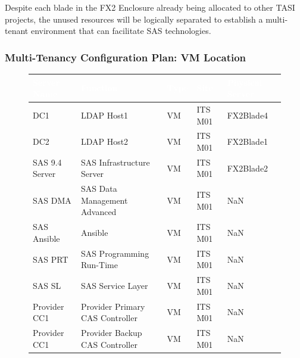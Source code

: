 Despite each blade in the FX2 Enclosure already being allocated to other TASI projects, the unused resources will be logically separated to establish a multi-tenant environment that can facilitate SAS technologies.

\newpage 

\subsubsection{Multi-Tenancy Configuration Plan: VM Location}
\label{Multi-Tenancy Configuration Plan}

\begin{figure}[H]
\begin{center}
    \renewcommand{\arraystretch}{1.5}
    \begin{tabular}{|>{\raggedright\arraybackslash}l 
                    |>{\raggedright\arraybackslash}m{6cm} 
                    |>{\raggedright\arraybackslash}l 
                    |>{\raggedright\arraybackslash}l 
                    |>{\raggedright\arraybackslash}l 
                    |}
    \hline
    \rowcolor[HTML]{196fb4}\centering\textcolor{white}{\large Server Name} 
                            & \centering\textcolor{white}{\large Function} 
                            & \centering\textcolor{white}{\large Type} 
                            & \centering\textcolor{white}{\large Site} 
                            & \centering\textcolor{white}{\large Physical Server} 
                            \tabularnewline 
    \hline
    DC1	           & LDAP Host1                         & VM & ITS M01 & FX2Blade4 \\\hline
    DC2	           & LDAP Host2                         & VM & ITS M01 & FX2Blade1 \\\hline
    SAS 9.4 Server & SAS Infrastructure Server          & VM & ITS M01 & FX2Blade2 \\\hline
    SAS DMA	       & SAS Data Management Advanced       & VM & ITS M01 & NaN	\\\hline
    SAS Ansible	   & Ansible	                        & VM & ITS M01 & NaN	\\\hline
    SAS PRT	       & SAS Programming Run-Time	        & VM & ITS M01 & NaN	\\\hline
    SAS SL	       & SAS Service Layer	                & VM & ITS M01 & NaN	\\\hline
    Provider CC1   & Provider Primary CAS Controller    & VM & ITS M01 & NaN	\\\hline
    Provider CC1   & Provider Backup CAS Controller     & VM & ITS M01 & NaN	\\\hline

\end{tabular}
\end{center}
\end{figure}

